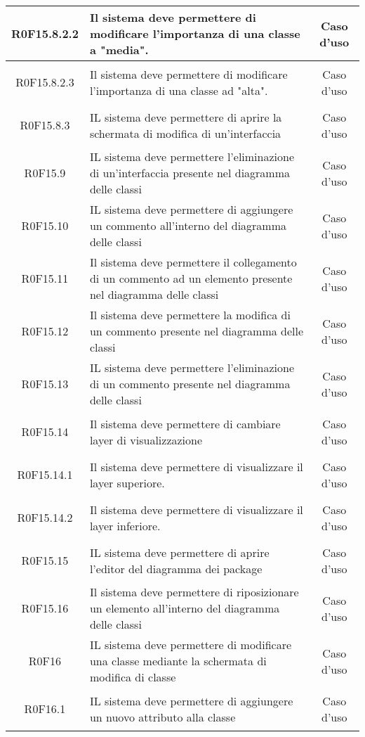 \documentclass[../AnalisiDeiRequisiti.tex]{subfiles}
\begin{document}
\begin{longtable}{|c|>{\centering}p{7cm}|c|}
\hypertarget{R0F15.8.2.2}{R0F15.8.2.2} & Il sistema deve permettere di modificare l'importanza di una classe a "media". & Caso d'uso \\ \hline
\hypertarget{R0F15.8.2.3}{R0F15.8.2.3} & Il sistema deve permettere di modificare l'importanza di una classe ad "alta". & Caso d'uso \\ \hline
\hypertarget{R0F15.8.3}{R0F15.8.3} & IL sistema deve permettere di aprire la schermata di modifica di un'interfaccia & Caso d'uso \\ \hline
\hypertarget{R0F15.9}{R0F15.9} & IL sistema deve permettere l'eliminazione di un'interfaccia presente nel diagramma delle classi & Caso d'uso \\ \hline
\hypertarget{R0F15.10}{R0F15.10} & IL sistema deve permettere di aggiungere un commento all'interno del diagramma delle classi & Caso d'uso \\ \hline
\hypertarget{R0F15.11}{R0F15.11} & Il sistema deve permettere il collegamento di un commento ad un elemento presente nel diagramma delle classi & Caso d'uso \\ \hline
\hypertarget{R0F15.12}{R0F15.12} & Il sistema deve permettere la modifica di un commento presente nel diagramma delle classi & Caso d'uso \\ \hline
\hypertarget{R0F15.13}{R0F15.13} & IL sistema deve permettere l'eliminazione di un commento presente nel diagramma delle classi & Caso d'uso \\ \hline
\hypertarget{R0F15.14}{R0F15.14} & Il sistema deve permettere di cambiare layer di visualizzazione & Caso d'uso \\ \hline
\hypertarget{R0F15.14.1}{R0F15.14.1} & Il sistema deve permettere di visualizzare il layer superiore. & Caso d'uso \\ \hline
\hypertarget{R0F15.14.2}{R0F15.14.2} & Il sistema deve permettere di visualizzare il layer inferiore. & Caso d'uso \\ \hline
\hypertarget{R0F15.15}{R0F15.15} & IL sistema deve permettere di aprire l'editor del diagramma dei package & Caso d'uso \\ \hline
\hypertarget{R0F15.16}{R0F15.16} & Il sistema deve permettere di riposizionare un elemento all'interno del diagramma delle classi & Caso d'uso \\ \hline
\hypertarget{R0F16}{R0F16} & IL sistema deve permettere di modificare una classe mediante la schermata di modifica di classe & Caso d'uso \\ \hline
\hypertarget{R0F16.1}{R0F16.1} & IL sistema deve permettere di aggiungere un nuovo attributo alla classe & Caso d'uso \\ \hline

\end{longtable}
\end{document}
